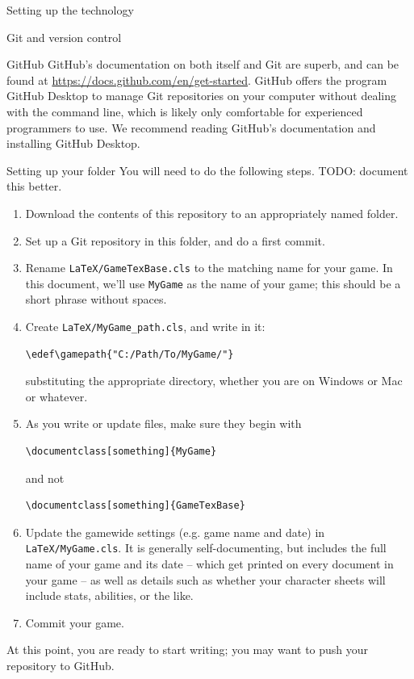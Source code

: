 \documentclass[sheet]{GameTexBase}
\begin{document}
\begin{section}{Setting up the technology}
\begin{subsection}{Git and version control}
\begin{subsubsection}{GitHub}
GitHub's documentation on both itself and Git are superb, and can be found at \url{https://docs.github.com/en/get-started}.  GitHub offers the program GitHub Desktop to manage Git repositories on your computer without dealing with the command line, which is likely only comfortable for experienced programmers to use.  We recommend reading GitHub's documentation and installing GitHub Desktop.
\end{subsubsection}
\end{subsection}
\begin{subsection}{Setting up your \gametex{} folder}
You will need to do the following steps.  TODO: document this better.
\begin{enumerate}
\item Download the contents of this repository to an appropriately named folder.
\item Set up a Git repository in this folder, and do a first commit.
\item Rename \lstinline|LaTeX/GameTexBase.cls| to the matching name for your game.  In this document, we'll use \lstinline|MyGame| as the name of your game; this should be a short phrase without spaces.
\item Create \lstinline|LaTeX/MyGame_path.cls|, and write in it:
\begin{verbatim}
\edef\gamepath{"C:/Path/To/MyGame/"}
\end{verbatim}
substituting the appropriate directory, whether you are on Windows or Mac or whatever.
\item As you write or update files, make sure they begin with
\begin{verbatim}
\documentclass[something]{MyGame}
\end{verbatim}
and not
\begin{verbatim}
\documentclass[something]{GameTexBase}
\end{verbatim}
\item Update the gamewide settings (e.g. game name and date) in \lstinline|LaTeX/MyGame.cls|.  It is generally self-documenting, but includes the full name of your game and its date -- which get printed on every document in your game -- as well as details such as whether your character sheets will include stats, abilities, or the like.
\item Commit your game.
\end{enumerate}
At this point, you are ready to start writing; you may want to push your repository to GitHub.
\end{subsection}
\end{section}
\end{document}
